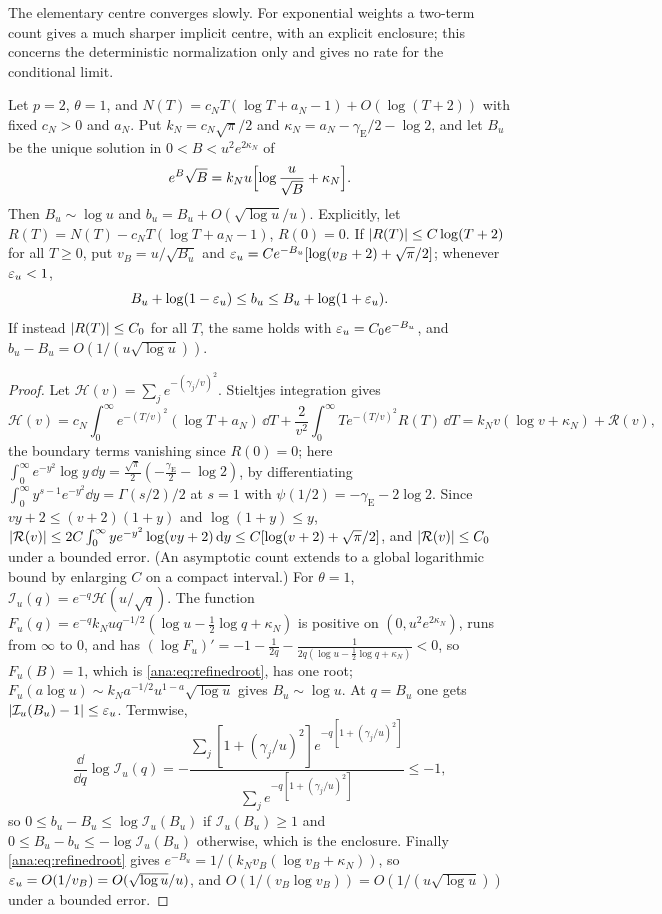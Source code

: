 The elementary centre converges slowly. For exponential weights a two-term count gives a much sharper
implicit centre, with an explicit enclosure; this concerns the deterministic normalization only and
gives no rate for the conditional limit.

\begin{proposition}\label{ana:prop:refinedcentre}
Let $p=2$, $\theta=1$, and $N(T)=c_NT(\log T+a_N-1)+O(\log(T+2))$ with fixed $c_N>0$ and $a_N$. Put
$k_N=c_N\sqrt\pi/2$ and $\kappa_N=a_N-\gamma_{\mathrm E}/2-\log2$, and let $B_u$ be the unique solution in
$0<B<u^2e^{2\kappa_N}$ of
\begin{equation}\label{ana:eq:refinedroot}
 e^B\sqrt B=k_Nu\Bigl[\log\frac u{\sqrt B}+\kappa_N\Bigr].
\end{equation}
Then $B_u\sim\log u$ and $b_u=B_u+O(\sqrt{\log u}/u)$. Explicitly, let $R(T)=N(T)-c_NT(\log T+a_N-1)$,
$R(0)=0$. If $\lvert R(T)\rvert\le C\log(T+2)$ for all $T\ge0$, put $v_B=u/\sqrt{B_u}$ and
$\varepsilon_u=Ce^{-B_u}[\log(v_B+2)+\sqrt\pi/2]$; whenever $\varepsilon_u<1$,
\[
 B_u+\log(1-\varepsilon_u)\le b_u\le B_u+\log(1+\varepsilon_u).
\]
If instead $\lvert R(T)\rvert\le C_0$ for all $T$, the same holds with $\varepsilon_u=C_0e^{-B_u}$, and
$b_u-B_u=O(1/(u\sqrt{\log u}))$.
\end{proposition}

\begin{proof}
Let $\mathcal H(v)=\sum_je^{-(\gamma_j/v)^2}$. Stieltjes integration gives
\[
 \mathcal H(v)=c_N\int_0^\infty e^{-(T/v)^2}(\log T+a_N)\,\dd T+\frac2{v^2}\int_0^\infty Te^{-(T/v)^2}R(T)\,\dd T
 =k_Nv(\log v+\kappa_N)+\mathcal R(v),
\]
the boundary terms vanishing since $R(0)=0$; here $\int_0^\infty e^{-y^2}\log y\,\dd y=\frac{\sqrt\pi}2(-\frac{\gamma_{\mathrm E}}2-\log2)$,
by differentiating $\int_0^\infty y^{s-1}e^{-y^2}\dd y=\Gamma(s/2)/2$ at $s=1$ with
$\psi(1/2)=-\gamma_{\mathrm E}-2\log2$. Since $vy+2\le(v+2)(1+y)$ and $\log(1+y)\le y$,
$\lvert\mathcal R(v)\rvert\le2C\int_0^\infty ye^{-y^2}\log(vy+2)\,\mathrm{d} y\le C[\log(v+2)+\sqrt\pi/2]$, and
$\lvert\mathcal R(v)\rvert\le C_0$ under a bounded error. (An asymptotic count extends to a global logarithmic
bound by enlarging $C$ on a compact interval.) For $\theta=1$, $\mathcal I_u(q)=e^{-q}\mathcal H(u/\sqrt q)$.
The function $F_u(q)=e^{-q}k_Nuq^{-1/2}(\log u-\frac12\log q+\kappa_N)$ is positive on
$(0,u^2e^{2\kappa_N})$, runs from $\infty$ to $0$, and has
$(\log F_u)'=-1-\frac1{2q}-\frac1{2q(\log u-\frac12\log q+\kappa_N)}<0$, so $F_u(B)=1$, which is
\eqref{ana:eq:refinedroot}, has one root; $F_u(a\log u)\sim k_Na^{-1/2}u^{1-a}\sqrt{\log u}$ gives
$B_u\sim\log u$. At $q=B_u$ one gets $\lvert\mathcal I_u(B_u)-1\rvert\le\varepsilon_u$. Termwise,
\[
 \frac{\dd}{\dd q}\log\mathcal I_u(q)=-\frac{\sum_j[1+(\gamma_j/u)^2]e^{-q[1+(\gamma_j/u)^2]}}{\sum_je^{-q[1+(\gamma_j/u)^2]}}\le-1,
\]
so $0\le b_u-B_u\le\log\mathcal I_u(B_u)$ if $\mathcal I_u(B_u)\ge1$ and $0\le B_u-b_u\le-\log\mathcal I_u(B_u)$
otherwise, which is the enclosure. Finally \eqref{ana:eq:refinedroot} gives
$e^{-B_u}=1/(k_Nv_B(\log v_B+\kappa_N))$, so $\varepsilon_u=O(1/v_B)=O(\sqrt{\log u}/u)$, and
$O(1/(v_B\log v_B))=O(1/(u\sqrt{\log u}))$ under a bounded error.
\end{proof}

